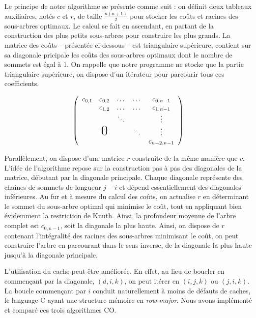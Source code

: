 \documentclass[a4paper, 10pt, french]{article}
\begin{document}
Le principe de notre algorithme se présente comme suit : on définit deux tableaux auxiliaires, notés $c$ et $r$, de taille $\frac{n(n+1)}{2}$ pour stocker les coûts et racines des sous-arbres optimaux. Le calcul se fait en ascendant, en partant de la construction des plus petits sous-arbres pour construire les plus grands. La matrice des coûts -- présentée ci-dessous -- est triangulaire supérieure, contient sur sa diagonale pricipale les coûts des sous-arbres optimaux dont le nombre de sommets est égal à $1$. On rappelle que notre programme ne stocke que la partie triangulaire supérieure, on dispose d'un itérateur pour parcourir tous ces coefficients. \par\leavevmode\par
\[
  \left(
  \begin{array}{ccccc}
      c_{0,1} & c_{0,2}       & \dots  & \dots  & c_{0,n-1}   \\
              & c_{1,2}       & \dots  & \dots  & c_{1,n-1}   \\
              &               & \ddots &        & \vdots      \\
              & \text{\huge0} &        & \ddots & \vdots      \\
              &               &        &        & c_{n-2,n-1}
    \end{array}
  \right)
\]
\par\leavevmode\par
Parallèlement, on dispose d'une matrice $r$ construite de la même manière que $c$. L'idée de l'algorithme repose sur la construction pas à pas des diagonales de la matrice, débutant par la diagonale principale. Chaque diagonale représente des chaînes de sommets de longueur $j - i$ et dépend essentiellement des diagonales inférieures. Au fur et à mesure du calcul des coûts, on actualise $r$ en déterminant le sommet du sous-arbre optimal qui minimise le coût, tout en appliquant bien évidemment la restriction de Knuth. Ainsi, la profondeur moyenne de l'arbre complet est $c_{0,n-1}$, soit la diagonale la plus haute.
Ainsi, on dispose de $r$ contenant l'intégralité des racines des sous-arbres minimisant le coût, on peut construire l'arbre en parcourant dans le sens inverse, de la diagonale la plus haute jusqu'à la diagonale principale.

L'utilisation du cache peut être améliorée. En effet, au lieu de boucler en commençant par la diagonale, $(d, i, k)$, on peut itérer en $(i, j, k)$ ou $(j, i, k)$. La boucle commençant par $i$ conduit naturellement à moins de défauts de caches, le language C ayant une structure mémoire en {\em row-major}. Nous avons implémenté et comparé ces trois algorithmes CO.
\end{document}

